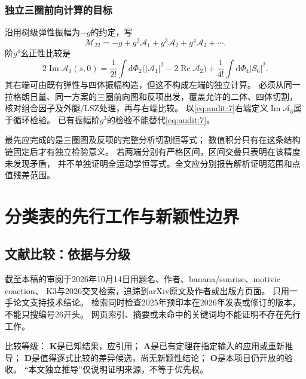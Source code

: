 \documentclass[11pt,a4paper]{ctexart}
\theoremstyle{cnplain}\newtheorem{theorem}{定理}[section]
\theoremstyle{definition}\newtheorem{definition}[theorem]{定义}
\theoremstyle{remark}\newtheorem{remark}[theorem]{注}
\newcommand{\dd}{\mathrm d}
\begin{document}
\subsubsection{独立三圈前向计算的目标}
沿用树级弹性振幅为$-g$的约定，写
\[
 \mathcal M_{22}=-g+g^2\mathcal A_1+g^3\mathcal A_2
                      +g^4\mathcal A_3+\cdots.
\]
阶$g^4$幺正性比较是
\begin{equation}
 2\operatorname{Im}\mathcal A_3(s,0)
 =\frac1{2!}\int\dd\Phi_2
       \bigl(|\mathcal A_1|^2-2\operatorname{Re}\mathcal A_2\bigr)
  +\frac1{4!}\int\dd\Phi_4|S_6|^2.                       \label{eq:audit:7}\end{equation}
其右端可由既有弹性与四体振幅构造，但这不构成左端的独立计算。
必须从同一拉格朗日量、同一方案的三圈前向图和反项出发，覆盖允许的二体、四体切割，
核对组合因子及外腿/LSZ处理，再与右端比较。
以\eqref{eq:audit:7}右端定义$\operatorname{Im}\mathcal A_3$属于循环检验。
已有振幅阶$g^3$的检验不能替代\eqref{eq:audit:7}。

最先应完成的是三圈图及反项的完整分析切割恒等式；
数值积分只有在这条结构链固定后才有独立检验意义。
若两端分别有严格区间，区间交叠只表明在该精度未发现矛盾，
并不单独证明全运动学恒等式。全文应分别报告解析证明范围和点值残差范围。


\section{分类表的先行工作与新颖性边界}\label{sec:literaturematrix}
\subsection{文献比较：依据与分级}
截至本稿的审阅于2026年10月14日用题名、作者、banana/sunrise、motivic coaction、
K3与2026交叉检索，追踪到arXiv原文及作者或出版方页面。
只用一手论文支持技术结论。
检索同时检查2025年预印本在2026年发表或修订的版本，不能只搜编号26开头。
网页索引、摘要或未命中的关键词均不能证明不存在先行工作。

比较等级：
\textbf{K}是已知结果，应引用；
\textbf{A}是已有定理在指定输入的应用或重新推导；
\textbf{D}是值得逐式比较的差异候选，尚无新颖性结论；
\textbf{O}是本项目仍开放的验收。
“本文独立推导”仅说明证明来源，不等于优先权。
\end{document}
